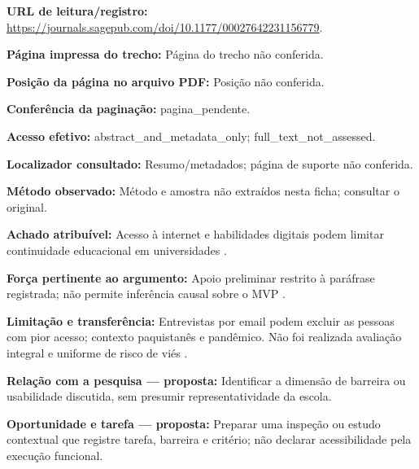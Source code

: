 \noindent\textbf{URL de leitura/registro:} \url{https://journals.sagepub.com/doi/10.1177/00027642231156779}.\par\medskip

\noindent\textbf{Página impressa do trecho:} Página do trecho não conferida.\par\medskip

\noindent\textbf{Posição da página no arquivo PDF:} Posição não conferida.\par\medskip

\noindent\textbf{Conferência da paginação:} pagina\_pendente.\par\medskip

\noindent\textbf{Acesso efetivo:} abstract\_and\_metadata\_only; full\_text\_not\_assessed.\par\medskip

\noindent\textbf{Localizador consultado:} Resumo/metadados; página de suporte não conferida.\par\medskip

\noindent\textbf{Método observado:} Método e amostra não extraídos nesta ficha; consultar o original.\par\medskip

\noindent\textbf{Achado atribuível:} Acesso à internet e habilidades digitais podem limitar continuidade educacional em universidades \citep{jamil2023}.\par\medskip

\noindent\textbf{Força pertinente ao argumento:} Apoio preliminar restrito à paráfrase registrada; não permite inferência causal sobre o MVP \citep{jamil2023}.\par\medskip

\noindent\textbf{Limitação e transferência:} Entrevistas por email podem excluir as pessoas com pior acesso; contexto paquistanês e pandêmico. Não foi realizada avaliação integral e uniforme de risco de viés \citep{jamil2023}.\par\medskip

\noindent\textbf{Relação com a pesquisa — proposta:} Identificar a dimensão de barreira ou usabilidade discutida, sem presumir representatividade da escola.\par\medskip

\noindent\textbf{Oportunidade e tarefa — proposta:} Preparar uma inspeção ou estudo contextual que registre tarefa, barreira e critério; não declarar acessibilidade pela execução funcional.\par\medskip

